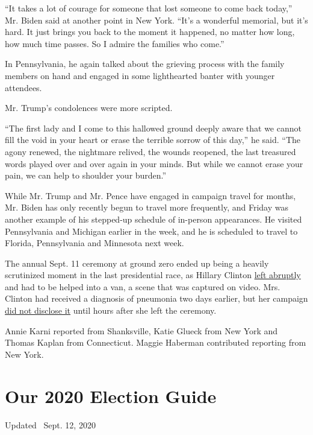 ``It takes a lot of courage for someone that lost someone to come back
today,'' Mr. Biden said at another point in New York. ``It's a wonderful
memorial, but it's hard. It just brings you back to the moment it
happened, no matter how long, how much time passes. So I admire the
families who come.''

In Pennsylvania, he again talked about the grieving process with the
family members on hand and engaged in some lighthearted banter with
younger attendees.

Mr. Trump's condolences were more scripted.

``The first lady and I come to this hallowed ground deeply aware that we
cannot fill the void in your heart or erase the terrible sorrow of this
day,'' he said. ``The agony renewed, the nightmare relived, the wounds
reopened, the last treasured words played over and over again in your
minds. But while we cannot erase your pain, we can help to shoulder your
burden.''

While Mr. Trump and Mr. Pence have engaged in campaign travel for
months, Mr. Biden has only recently begun to travel more frequently, and
Friday was another example of his stepped-up schedule of in-person
appearances. He visited Pennsylvania and Michigan earlier in the week,
and he is scheduled to travel to Florida, Pennsylvania and Minnesota
next week.

The annual Sept. 11 ceremony at ground zero ended up being a heavily
scrutinized moment in the last presidential race, as Hillary Clinton
\href{https://www.nytimes3xbfgragh.onion/2016/09/12/us/politics/hillary-clinton-campaign-pneumonia.html}{left
abruptly} and had to be helped into a van, a scene that was captured on
video. Mrs. Clinton had received a diagnosis of pneumonia two days
earlier, but her campaign
\href{https://www.nytimes3xbfgragh.onion/2016/09/13/us/hillary-clinton-pneumonia.html}{did
not disclose it} until hours after she left the ceremony.

Annie Karni reported from Shanksville, Katie Glueck from New York and
Thomas Kaplan from Connecticut. Maggie Haberman contributed reporting
from New York.

\hypertarget{our-2020-election-guide}{%
\section{Our 2020 Election Guide}\label{our-2020-election-guide}}

Updated ~Sept. 12, 2020

